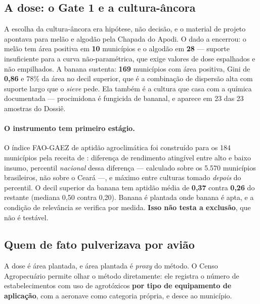 \subsection{A dose: o Gate 1 e a cultura-âncora}
\label{sub:dose-gate1}

A escolha da cultura-âncora era hipótese, não decisão, e o material de projeto
apontava para melão e algodão pela Chapada do Apodi. O dado a encerrou: o melão
tem área positiva em \textbf{10} municípios e o algodão em \textbf{28} ---
suporte insuficiente para a curva não-paramétrica, que exige valores de dose
espalhados e não empilhados. A banana sustenta: \textbf{169} municípios com área
positiva, Gini de \textbf{0,86} e 78\% da área no decil superior, que é a
combinação de dispersão alta com suporte largo que o \emph{sieve} pede. Ela
também é a cultura que casa com a química documentada --- procimidona é
fungicida de bananal, e aparece em 23 das 23 amostras do Dossiê.

\paragraph{O instrumento tem primeiro estágio.}
O índice FAO-GAEZ de aptidão agroclimática foi construído para os 184
municípios pela receita de \citet{reynier2025glyphosate}: diferença de
rendimento atingível entre alto e baixo insumo, percentil \emph{nacional} dessa
diferença --- calculado sobre os 5.570 municípios brasileiros, não sobre o Ceará
---, e máximo entre culturas tomado \emph{depois} do percentil. O decil superior
da banana tem aptidão média de \textbf{0,37} contra \textbf{0,26} do restante
(mediana 0,50 contra 0,20). Banana é plantada onde banana é apta, e a condição
de relevância se verifica por medida. \textbf{Isso não testa a exclusão}, que
não é testável.

\subsection{Quem de fato pulverizava por avião}
\label{sub:equipamento}

A dose é área plantada, e área plantada é \emph{proxy} do método. O Censo
Agropecuário permite olhar o método diretamente: ele registra o número de
estabelecimentos com uso de agrotóxicos \textbf{por tipo de equipamento de
aplicação}, com a aeronave como categoria própria, e desce ao município.

